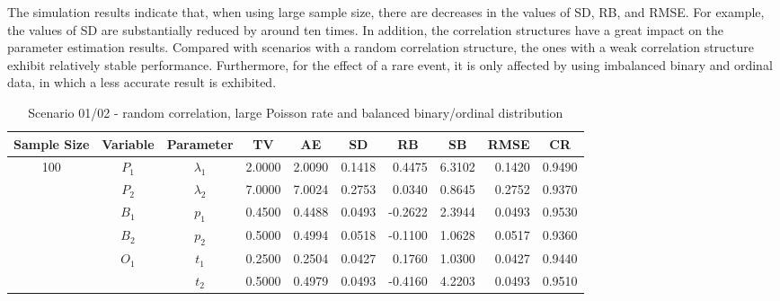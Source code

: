 \documentclass[letterpaper]{article}
\begin{document}
The simulation results indicate that, when using large sample size, there are decreases in the values of SD, RB, and RMSE. For example, the values of SD are substantially reduced by around ten times. In addition, the correlation structures have a great impact on the parameter estimation results. Compared with scenarios with a random correlation structure, the ones with a weak correlation structure exhibit relatively stable performance. Furthermore, for the effect of a rare event, it is only affected by using imbalanced binary and ordinal data, in which a less accurate result is exhibited.\\


\begin{table}[h]
\centering
\caption{Scenario 01/02 - random correlation, large Poisson rate and balanced binary/ordinal distribution}
\begin{tabular}{cccrrrrrrr}
\hline
Sample Size & Variable    & Parameter      & \multicolumn{1}{c}{TV} & \multicolumn{1}{c}{AE} & \multicolumn{1}{c}{SD} & \multicolumn{1}{c}{RB} & \multicolumn{1}{c}{SB} & \multicolumn{1}{c}{RMSE} & \multicolumn{1}{c}{CR} \\\hline
100         & $P_1$       & $\lambda_1$    & 2.0000                 & 2.0090                 & 0.1418                 & 0.4475                 & 6.3102                 & 0.1420                   & 0.9490                 \\
            & $P_2$       & $\lambda_2$    & 7.0000                 & 7.0024                 & 0.2753                 & 0.0340                 & 0.8645                 & 0.2752                   & 0.9370                 \\
            & $B_1$       & $p_1$          & 0.4500                 & 0.4488                 & 0.0493                 & -0.2622                & 2.3944                 & 0.0493                   & 0.9530                 \\
            & $B_2$       & $p_2$          & 0.5000                 & 0.4994                 & 0.0518                 & -0.1100                & 1.0628                 & 0.0517                   & 0.9360                 \\
            & $O_1$       & $t_1$          & 0.2500                 & 0.2504                 & 0.0427                 & 0.1760                 & 1.0300                 & 0.0427                   & 0.9440                 \\
            &             & $t_2$          & 0.5000                 & 0.4979                 & 0.0493                 & -0.4160                & 4.2203                 & 0.0493                   & 0.9510                 \\

\end{tabular}
\end{table}
\end{document}
